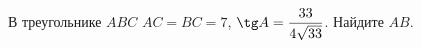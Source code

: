 \begin{ex}
	\begin{condition}
		В треугольнике \(ABC\) \( AC=BC=7 \),  \( \tg A=\dfrac{33}{4\sqrt{33}} \).  Найдите \( AB \).
	\end{condition}
\end{ex}